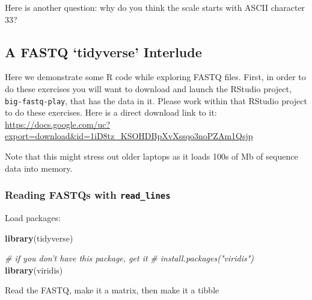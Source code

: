 \documentclass[]{krantz}
\makeatletter
\newenvironment{Shaded}{\begin{snugshade}}{\end{snugshade}}
\newcommand{\CommentTok}[1]{\textcolor[rgb]{0.37,0.37,0.37}{\textit{#1}}}
\newcommand{\KeywordTok}[1]{\textcolor[rgb]{0.27,0.27,0.27}{\textbf{#1}}}
\newcommand{\NormalTok}[1]{#1}
\newenvironment{kframe}{%
\medskip{}
\setlength{\fboxsep}{.8em}
 \def\at@end@of@kframe{}%
 \ifinner\ifhmode%
  \def\at@end@of@kframe{\end{minipage}}%
  \begin{minipage}{\columnwidth}%
 \fi\fi%
 \def\FrameCommand##1{\hskip\@totalleftmargin \hskip-\fboxsep
 \colorbox{shadecolor}{##1}\hskip-\fboxsep
     \hskip-\linewidth \hskip-\@totalleftmargin \hskip\columnwidth}%
 \MakeFramed {\advance\hsize-\width
   \@totalleftmargin\z@ \linewidth\hsize
   \@setminipage}}%
 {\par\unskip\endMakeFramed%
 \at@end@of@kframe}
\renewenvironment{Shaded}{\begin{kframe}}{\end{kframe}}
\makeatother
\begin{document}
Here is another question: why do you think the scale starts with ASCII character 33?

\hypertarget{a-fastq-tidyverse-interlude}{%
\subsection{A FASTQ `tidyverse' Interlude}\label{a-fastq-tidyverse-interlude}}

Here we demonstrate some R code while exploring FASTQ files. First, in order to
do these exercises you will want to download and launch the RStudio project,
\texttt{big-fastq-play},
that has the data
in it. Please work within that RStudio project to do these exercises.
Here is a direct download link to it:
\url{https://docs.google.com/uc?export=download\&id=1iD8tz_KSOHDBpXvXssqo3noPZAm1Qsjp}

Note that this might stress out older laptops as it loads 100s of Mb of sequence
data into memory.

\hypertarget{reading-fastqs-with-read_lines}{%
\subsubsection{\texorpdfstring{Reading FASTQs with \texttt{read\_lines}}{Reading FASTQs with read\_lines}}\label{reading-fastqs-with-read_lines}}

Load packages:

\begin{Shaded}
\begin{Highlighting}[]
\KeywordTok{library}\NormalTok{(tidyverse)}

\CommentTok{# if you don't have this package, get it}
\CommentTok{# install.packages("viridis")}
\KeywordTok{library}\NormalTok{(viridis)}
\end{Highlighting}
\end{Shaded}

Read the FASTQ, make it a matrix, then make it a tibble
\end{document}
